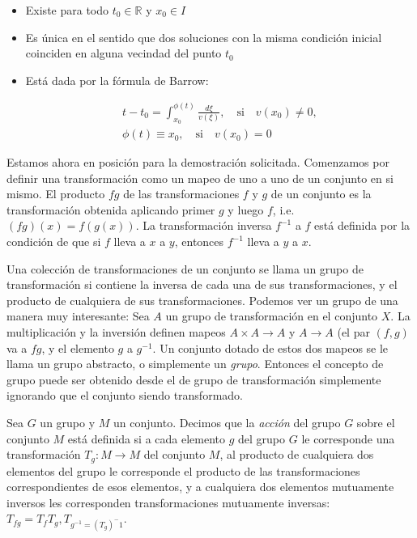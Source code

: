\documentclass[a4paper,10pt]{article}
\numberwithin{equation}{section}
\begin{document}
\begin{itemize}
 \item Existe para todo $t_0 \in \mathbb{R}$ y $x_0 \in I$
 \item Es única en el sentido que dos soluciones con la misma condición
 inicial coinciden en alguna vecindad del punto $t_0$
 \item Está dada por la fórmula de Barrow:
 
 \begin{gather*}
  t - t_0= \int_{x_0}^{\phi(t)} \frac{d\xi}{v(\xi)}, \quad \text{si} \quad v(x_0) \neq 0, \\
  \phi(t) \equiv x_0, \quad \text{si} \quad v(x_0) = 0
 \end{gather*}
\end{itemize}

Estamos ahora en posición para la demostración solicitada. Comenzamos por
definir una transformación como un mapeo de uno a uno de un conjunto en si mismo. El 
producto $fg$ de las transformaciones $f$ y $g$ de un conjunto es la 
transformación obtenida aplicando primer $g$ y luego $f$, i.e. $(fg)(x) = f(g(x))$. La 
transformación inversa $f^{-1}$ a $f$ está definida por la condición de que si
$f$ lleva a $x$ a $y$, entonces $f^{-1}$ lleva a $y$ a $x$.

\vspace{.3cm}

Una colección de transformaciones de un conjunto se llama un grupo de 
transformación si contiene la inversa de cada una de sus transformaciones,
y el producto de cualquiera de sus transformaciones. Podemos ver un grupo
de una manera muy interesante: Sea $A$ un grupo de transformación en el 
conjunto $X$. La multiplicación y la inversión definen mapeos 
$A \times A \rightarrow A$ y $A \rightarrow A$ (el par $(f,g)$ va a $fg$, y 
el elemento $g$ a $g^{-1}$. Un conjunto dotado de estos dos mapeos se le 
llama un grupo abstracto, o simplemente un \emph{grupo}. Entonces el concepto
de grupo puede ser obtenido desde el de grupo de transformación simplemente
ignorando que el conjunto siendo transformado.

\vspace{.3cm}

Sea $G$ un grupo y $M$ un conjunto. Decimos que la \emph{acción} del
grupo $G$ sobre el conjunto $M$ está definida si a cada elemento $g$ del
grupo $G$ le corresponde una transformación $T_g:M \rightarrow M$ del 
conjunto $M$, al producto de cualquiera dos elementos del grupo le corresponde
el producto de las transformaciones correspondientes de esos elementos, y 
a cualquiera dos elementos mutuamente inversos les corresponden transformaciones
mutuamente inversas: $T_{fg} = T_f T_g, T_{g^{-1} = (T_g)^-1}$. 
\end{document}
